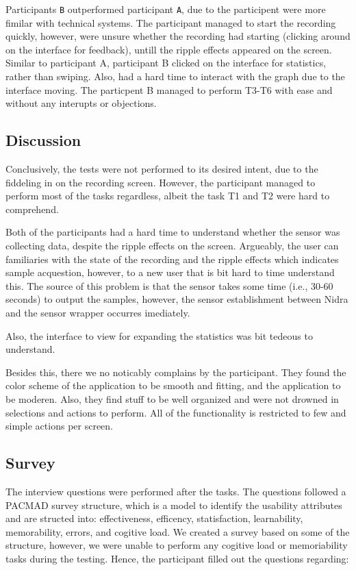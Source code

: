 Participants \verb|B| outperformed participant \verb|A|, due to the participent were more fimilar with technical systems. The participant managed to start the recording quickly, however, were unsure whether the recording had starting (clicking around on the interface for feedback), untill the ripple effects appeared on the screen. Similar to participant A, participant B clicked on the interface for statistics, rather than swiping. Also, had a hard time to interact with the graph due to the interface moving. The particpent B managed to perform T3-T6 with ease and without any interupts or objections. 


\subsection{Discussion}

Conclusively, the tests were not performed to its desired intent, due to the fiddeling in on the recording screen. However, the participant managed to perform most of the tasks regardless, albeit the task T1 and T2 were hard to comprehend. 

Both of the participants had a hard time to understand whether the sensor was collecting data, despite the ripple effects on the screen. Argueably, the user can familiaries with the state of the recording and the ripple effects which indicates sample acquestion, however, to a new user that is bit hard to time understand this. The source of this problem is that the sensor takes some time (i.e., 30-60 seconds) to output the samples, however, the sensor establishment between Nidra and the sensor wrapper occurres imediately. 

Also, the interface to view for expanding the statistics was bit tedeous to understand. 

Besides this, there we no noticably complains by the participant. They found the color scheme of the application to be smooth and fitting, and the application to be moderen. Also, they find stuff to be well organized and were not drowned in selections and actions to perform. All of the functionality is restricted to few and simple actions per screen. 

\subsection{Survey}
The interview questions were performed after the tasks. The questions followed a PACMAD survey structure, which is a model to identify the usability attributes and are structed into: effectiveness, efficency, statisfaction, learnability, memorability, errors, and cogitive load. We created a survey based on some of the structure, however, we were unable to perform any cogitive load or memoriability tasks during the testing. Hence, the participant filled out the questions regarding: 

